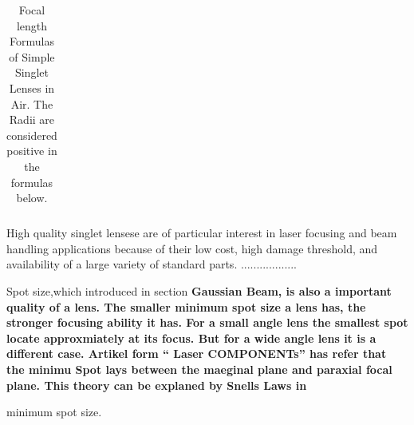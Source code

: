 \begin{table}
\begin{tabular}{|c|c|c|}
\hline
\end{tabular}
\caption{Focal length Formulas of Simple Singlet Lenses in Air.  
				 The Radii are considered positive in the formulas below.}
\label{tab:lenses_focal_length}
\end{table}


High quality singlet lensese are of particular interest in laser focusing and beam handling applications because of their low cost, high damage threshold, and availability of a large variety of standard parts. ..................

Spot size,which introduced in section \bf{Gaussian Beam}, is also a important quality of a lens. The smaller minimum spot size a lens has, the stronger focusing ability it has.  For a small angle lens the smallest spot locate approxmiately at its focus. But for a wide angle lens it is a different case.
Artikel form "` Laser COMPONENTs"' has refer that the minimu Spot lays between the maeginal plane and paraxial focal plane. This theory can be explaned by Snells Laws in 

minimum spot size.

	